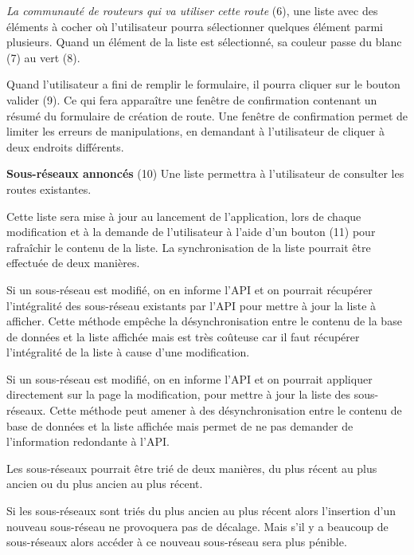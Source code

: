 \textit{La communauté de routeurs qui va utiliser cette route} (6), une liste avec des éléments à cocher où l'utilisateur pourra sélectionner quelques élément parmi plusieurs.
Quand un élément de la liste est sélectionné, sa couleur passe du blanc (7) au vert (8).

Quand l'utilisateur a fini de remplir le formulaire, il pourra cliquer sur le bouton valider (9).
Ce qui fera apparaître une fenêtre de confirmation contenant un résumé du formulaire de création de route.
Une fenêtre de confirmation permet de limiter les erreurs de manipulations, en demandant à l'utilisateur de cliquer à deux endroits différents.\newline

\textbf{Sous-réseaux annoncés} (10)\newline
Une liste permettra à l'utilisateur de consulter les routes existantes.

Cette liste sera mise à jour au lancement de l'application, lors de chaque modification et à la demande de l'utilisateur à l'aide d'un bouton (11) pour rafraîchir le contenu de la liste.
La synchronisation de la liste pourrait être effectuée de deux manières.

Si un sous-réseau est modifié, on en informe l'API et on pourrait récupérer l'intégralité des sous-réseau existants par l'API pour mettre à jour la liste à afficher. Cette méthode empêche la désynchronisation entre le contenu de la base de données et la liste affichée mais est très coûteuse car il faut récupérer l'intégralité de la liste à cause d'une modification.

Si un sous-réseau est modifié, on en informe l'API et on pourrait appliquer directement sur la page la modification, pour mettre à jour la liste des sous-réseaux. Cette méthode peut amener à des désynchronisation entre le contenu de  base de données et la liste affichée mais permet de ne pas demander de l'information redondante à l'API.

Les sous-réseaux pourrait être trié de deux manières, du plus récent au plus ancien ou du plus ancien au plus récent.

Si les sous-réseaux sont triés du plus ancien au plus récent alors l'insertion d'un nouveau sous-réseau ne provoquera pas de décalage. Mais s'il y a beaucoup de sous-réseaux alors accéder à ce nouveau sous-réseau sera plus pénible.

